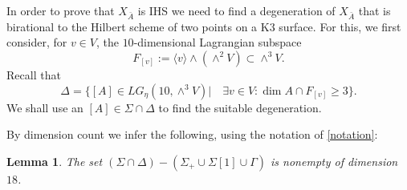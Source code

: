 \documentclass[a4paper,11pt]{amsart}
\newtheorem{lem}[thm]{Lemma}
\theoremstyle{definition}
\numberwithin{equation}{section}
\numberwithin{equation}{section} \theoremstyle{definition}
\begin{document}
 
 
 
 
 
 
 
 

 In order to prove that $X_{\bar{A}}$ is IHS we need to find a degeneration of $X_{\bar{A}}$ that is birational to the Hilbert scheme of two points on a K3 surface. 
 For this, we first consider, for $v\in V$, the $10$-dimensional Lagrangian subspace  
 \[
 F_{[v]}:=\langle v\rangle\wedge(\wedge^2 V)\subset \wedge^3 V.
 \]
 Recall that  
 \[
 \Delta=\{ [A]\in LG_\eta(10,\wedge^3V)| \quad \exists v\in V \colon \dim A\cap F_{[v]}\geq 3 \}.
 \]
We shall use an $[A]\in \Sigma\cap \Delta$ to find the suitable degeneration.

 By dimension count we infer the following, using the notation of \ref{notation}:
 \begin{lem} \label{dim sigma delta } The set $(\Sigma\cap \Delta)-(\Sigma_+\cup \Sigma[1] \cup \Gamma)$ is nonempty of dimension $18$. 
 \end{lem}
\end{document}
